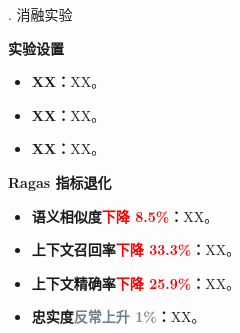 \begin{frame}{\MakeUppercase{}.{} 消融实验}
    \vspace{-0.5em}

    

    \vspace{-0.8em}

    \begin{block}{\textbf{实验设置}}
        \vspace{-0.5em}

        \begin{itemize}
                \small
            \item \textbf{XX：}XX。
            \item \textbf{XX：}XX。
            \item \textbf{XX：}XX。
        \end{itemize}
    \end{block}

    \vspace{-0.8em}

    \begin{block}{\textbf{Ragas 指标退化}}
        \vspace{-0.5em}

        \begin{itemize}
                \small
            \item \textbf{语义相似度\textcolor{Red}{下降 8.5\%}：}XX。
            \item \textbf{上下文召回率\textcolor{Red}{下降 33.3\%}：}XX。
            \item \textbf{上下文精确率\textcolor{Red}{下降 25.9\%}：}XX。
            \item \textbf{忠实度\textcolor{SlateGrey}{反常上升 1\%}：}XX。
        \end{itemize}
    \end{block}
\end{frame}

